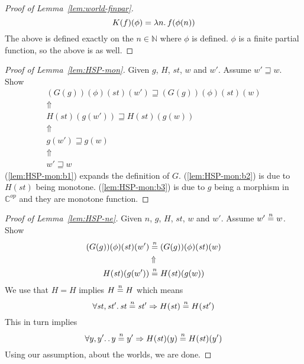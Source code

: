 \documentclass{article}
\newcommand{\nequal}[1][n]{\stackrel{\tiny{#1}}{=}}
\newcommand{\CatC}{\mathbb{C}}
\newcommand{\var}[1]{\mathit{#1}}
\newcommand{\future}{\mathbin{\sqsupseteq}}
\newcommand{\nats}{\mathbb{N}}
\begin{document}
\begin{proof}[Proof of Lemma~\ref{lem:world-finpar}]
\[
  K(f)(\phi) = \lambda n \ldotp f(\phi(n))
\]
The above is defined exactly on the $n\in \nats$ where $\phi$ is defined. $\phi$ is a finite partial function, so the above is as well.
\end{proof}

\begin{proof}[Proof of Lemma~\ref{lem:HSP-mon}]
  Given $g$, $H$, $\var{st}$, $w$ and $w'$. Assume $w' \future w$. Show
  \begin{gather}
    (G(g))(\phi)(\var{st})(w') \future (G(g))(\phi)(\var{st})(w) \nonumber\\ 
    \Uparrow \label{lem:HSP-mon:b1}\\
    H(\var{st})(g(w')) \future H(\var{st})(g(w)) \nonumber \\
    \Uparrow \label{lem:HSP-mon:b2}\\
    g(w') \future g(w) \nonumber\\
    \Uparrow \label{lem:HSP-mon:b3}\\
    w' \future w \nonumber
  \end{gather}
(\ref{lem:HSP-mon:b1}) expands the definition of $G$. (\ref{lem:HSP-mon:b2}) is due to $H(\var{st})$ being monotone. (\ref{lem:HSP-mon:b3}) is due to $g$ being a morphism in $\CatC^{\var{op}}$ and they are monotone function.
\end{proof}

\begin{proof}[Proof of Lemma~\ref{lem:HSP-ne}]
  Given $n$, $g$, $H$, $\var{st}$, $w$ and $w'$. Assume $w' \nequal w$. Show
  \begin{gather}
    (G(g))(\phi)(\var{st})(w') \nequal (G(g))(\phi)(\var{st})(w) \nonumber\\ 
    \Uparrow \nonumber \\
    H(\var{st})(g(w')) \nequal H(\var{st})(g(w)) \nonumber \\
  \end{gather}
  We use that $H=H$ implies $H \nequal H$ which means
  \[
    \forall \var{st}, \var{st'} \ldotp \var{st} \nequal \var{st'} \Rightarrow H(\var{st}) \nequal H(\var{st'})
  \]
  This in turn implies
  \[
    \forall y,y' \ldotp \ldotp y \nequal y' \Rightarrow H(\var{st})(y) \nequal H(\var{st})(y')
  \]
  Using our assumption, about the worlds, we are done.
\end{proof}
\end{document}
